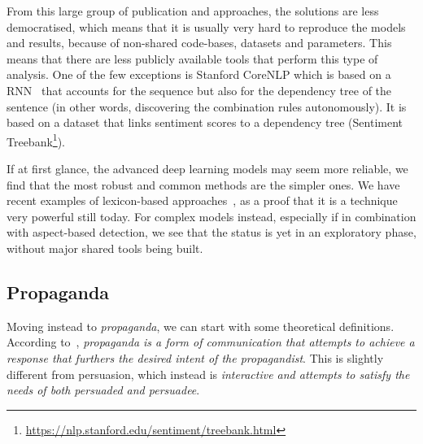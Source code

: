 
From this large group of publication and approaches, the solutions are less democratised, which means that it is usually very hard to reproduce the models and results, because of non-shared code-bases, datasets and parameters.
This means that there are less publicly available tools that perform this type of analysis.
One of the few exceptions is Stanford CoreNLP which is based on a RNN~\citep{socher2013recursive} that accounts for the sequence but also for the dependency tree of the sentence (in other words, discovering the combination rules autonomously). It is based on a dataset that links sentiment scores to a dependency tree (Sentiment Treebank\footnote{\url{https://nlp.stanford.edu/sentiment/treebank.html}}).

If at first glance, the advanced deep learning models may seem more reliable, we find that the most robust and common methods are the simpler ones.
We have recent examples of lexicon-based approaches~\citep{okango2022dictionary,mitra2020sentiment}, as a proof that it is a technique very powerful still today.
For complex models instead, especially if in combination with aspect-based detection, we see that the status is yet in an exploratory phase, without major shared tools being built.

\subsection{\statusgreen Propaganda}
\label{sec:lit_propaganda}

Moving instead to \emph{propaganda}, we can start with some theoretical definitions.
According to~\cite{jowett2012propaganda}, \emph{propaganda  is  a  form  of  communication  that  attempts  to  achieve a  response  that  furthers  the  desired  intent  of  the  propagandist}. This is slightly different from persuasion, which instead is \emph{interactive and attempts to satisfy the needs of both persuaded and persuadee}.  %





